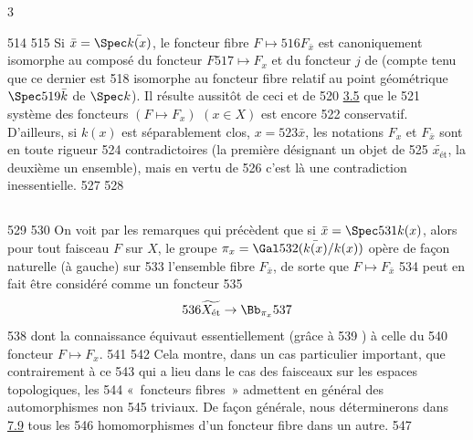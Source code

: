 3	\documentclass[10pt]{../fichiers-configuration-latex/smfart}
\begin{document}
   514	
   515	Si $\bar{x} = \Spec \bar{k(x)}$, le foncteur fibre $F \mapsto
   516	F_{\bar{x}}$ est canoniquement isomorphe au composé du foncteur $F
   517	\mapsto F_x$ et du foncteur $j$ de  (compte tenu que ce dernier est
   518	isomorphe au foncteur fibre relatif au point géométrique $\Spec
   519	\bar{k}$ de $\Spec k$). Il résulte aussitôt de ceci et de
   520	\hyperref[VIII.thm3.5]{3.5} que le
   521	système des foncteurs $(F \mapsto F_x)$ $(x \in X)$ est encore
   522	conservatif. D'ailleurs, si $k(x)$ est séparablement clos, \ie $x =
   523	\bar{x}$, les notations $F_x$ et $F_{\bar{x}}$ sont en toute rigueur
   524	contradictoires (la première désignant un objet de
   525	$\widetilde{x_{\text{ét}}}$, la deuxième un ensemble), mais en vertu de
   526	 c'est là une contradiction inessentielle.
   527	
   528	\subsection{}
   529	
   530	On voit par les remarques qui précèdent que si $\bar{x} = \Spec
   531	k(x)$, alors pour tout faisceau $F$ sur $X$, le groupe $\pi_x = \Gal
   532	(\bar{k(x)}/ k(x))$ opère de façon naturelle (à gauche) sur
   533	l'ensemble fibre $F_{\bar{x}}$, de sorte que $F \mapsto F_{\bar{x}}$
   534	peut en fait être considéré comme un foncteur
   535	$$
   536	\widetilde{X_{\text{ét}}} \to \Bb_{\pi_x}
   537	$$
   538	dont la connaissance équivaut essentiellement (grâce à
   539	) à celle du
   540	foncteur $F \mapsto F_x$.
   541	
   542	Cela montre, dans un cas particulier important, que contrairement à ce
   543	qui a lieu dans le cas des faisceaux sur les espaces topologiques, les
   544	« foncteurs fibres » admettent en général des automorphismes non
   545	triviaux. De façon générale, nous déterminerons dans \hyperref[VIII.thm7.9]{7.9} tous les
   546	homomorphismes d'un foncteur fibre dans un autre.
   547	
\end{document}
